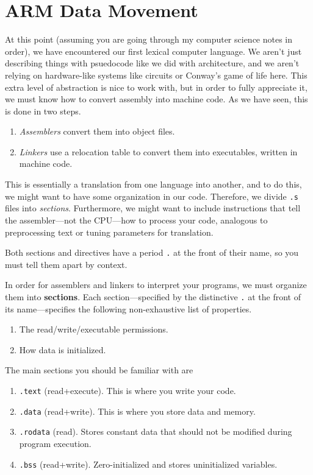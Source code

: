 \section{ARM Data Movement} 

  At this point (assuming you are going through my computer science notes in order), we have encountered our first lexical computer language. We aren't just describing things with psuedocode like we did with architecture, and we aren't relying on hardware-like systems like circuits or Conway's game of life here. This extra level of abstraction is nice to work with, but in order to fully appreciate it, we must know how to convert assembly into machine code. As we have seen, this is done in two steps. 
  \begin{enumerate}
    \item \textit{Assemblers} convert them into object files. 
    \item \textit{Linkers} use a relocation table to convert them into executables, written in machine code. 
  \end{enumerate} 
  This is essentially a translation from one language into another, and to do this, we might want to have some organization in our code. Therefore, we divide \texttt{.s} files into \textit{sections}. Furthermore, we might want to include instructions that tell the assembler---not the CPU---how to process your code, analogous to preprocessing text or tuning parameters for translation. 

  Both sections and directives have a period \texttt{.} at the front of their name, so you must tell them apart by context. 

  \begin{definition}[Section]
    In order for assemblers and linkers to interpret your programs, we must organize them into \textbf{sections}. Each section---specified by the distinctive \texttt{.} at the front of its name---specifies the following non-exhaustive list of properties. 
    \begin{enumerate}
      \item The read/write/executable permissions. 
      \item How data is initialized. 
    \end{enumerate}
  \end{definition} 

  \begin{example}
    The main sections you should be familiar with are 
    \begin{enumerate}
      \item \texttt{.text} (read+execute). This is where you write your code. 
      \item \texttt{.data} (read+write). This is where you store data and memory. 
      \item \texttt{.rodata} (read). Stores constant data that should not be modified during program execution. 
      \item \texttt{.bss} (read+write). Zero-initialized and stores uninitialized variables. 
    \end{enumerate}
  \end{example} 

